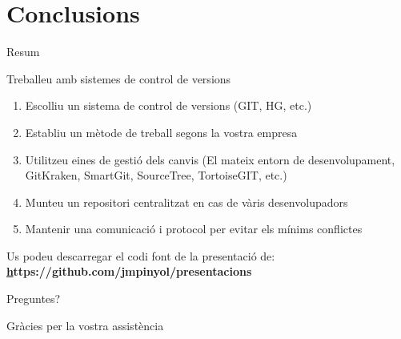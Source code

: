 \documentclass[10pt,xcolor={rgb}]{beamer}
\begin{document}
    \section{Conclusions}
    
    \begin{frame}{Resum}
      \begin{block}{Treballeu amb sistemes de control de versions}
        
                \begin{enumerate}
                  \item Escolliu un sistema de control de versions (GIT, HG, etc.)
                  \item Establiu un mètode de treball segons la vostra empresa
                  \item Utilitzeu eines de gestió dels canvis (El mateix entorn de desenvolupament, GitKraken, SmartGit, SourceTree, TortoiseGIT, etc.)
                  \item Munteu un repositori centralitzat en cas de vàris desenvolupadors
                  \item Mantenir una comunicació i protocol per evitar els mínims conflictes
                \end{enumerate}
        
      \end{block}

      \centering
      Us podeu descarregar el codi font de la presentació de:
      \textbf{\href{https://github.com/jmpinyol/presentacions}https://github.com/jmpinyol/presentacions}
    \end{frame}
    
    \begin{frame}[standout]
      Preguntes?
    \end{frame}

    \begin{frame}{}
      Gràcies per la vostra assistència
    \end{frame}
    
\end{document}
